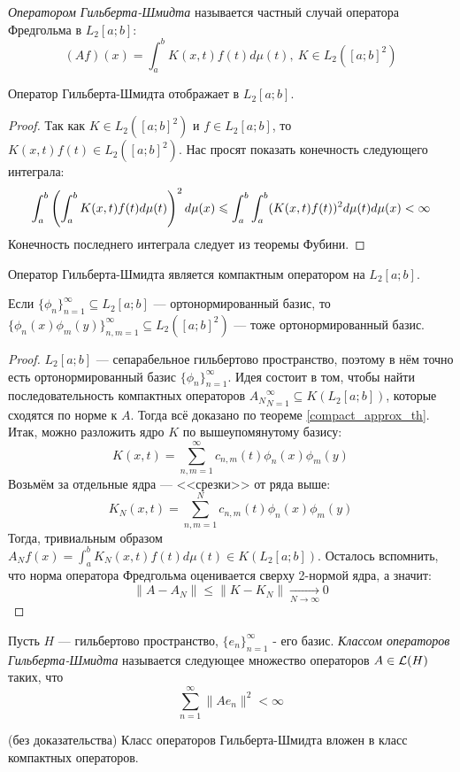 \begin{definition}
	\textit{Оператором Гильберта-Шмидта} называется частный случай оператора Фредгольма в $L_2[a; b]$:
	\[
		(Af)(x) = \int_a^b K(x, t)f(t)d\mu(t),\ K \in L_2([a; b]^2)
	\]
\end{definition}

\begin{proposition}
	Оператор Гильберта-Шмидта отображает в $L_2[a; b]$.
\end{proposition}

\begin{proof}
	Так как $K \in L_2([a; b]^2)$ и $f \in L_2[a; b]$, то $K(x, t)f(t) \in L_2([a; b]^2)$. Нас просят показать конечность следующего интеграла:
	\[
		\int_a^b \left(\int_a^b K(x, t)f(t)d\mu(t)\right)^2d\mu(x) \leqslant \int_a^b \int_a^b (K(x, t)f(t))^2d\mu(t)d\mu(x) < \infty
	\]
	Конечность последнего интеграла следует из теоремы Фубини.
\end{proof}

\begin{theorem}
	Оператор Гильберта-Шмидта является компактным оператором на $L_2[a; b]$.
\end{theorem}

\begin{reminder}
	Если $\{\phi_n\}_{n = 1}^\infty \subseteq L_2[a; b]$ --- ортонормированный базис, то \\ $\{\phi_n(x)\phi_m(y)\}_{n, m = 1}^\infty \subseteq L_2([a; b]^2)$ --- тоже ортонормированный базис.
\end{reminder}

\begin{proof}
	$L_2[a; b]$ --- сепарабельное гильбертово пространство, поэтому в нём точно есть ортонормированный базис $\{\phi_n\}_{n = 1}^\infty$. Идея состоит в том, чтобы найти последовательность компактных операторов ${A_N}_{N = 1}^\infty \subseteq K(L_2[a; b])$, которые сходятся по норме к $A$. Тогда всё доказано по теореме \ref{compact_approx_th}. Итак, можно разложить ядро $K$ по вышеупомянутому базису:
	\[
		K(x, t) = \sum_{n, m = 1}^\infty c_{n, m}(t)\phi_n(x)\phi_m(y)
	\]
	Возьмём за отдельные ядра --- <<срезки>> от ряда выше:
	\[
		K_N(x, t) = \sum_{n, m = 1}^N c_{n, m}(t)\phi_n(x)\phi_m(y)
	\]
	Тогда, тривиальным образом $A_Nf(x) = \int_a^b K_N(x, t)f(t)d\mu(t) \in K(L_2[a; b])$. Осталось вспомнить, что норма оператора Фредгольма оценивается сверху 2-нормой ядра, а значит:
	\[
		\|A - A_N\| \le \|K - K_N\| \xrightarrow[N \to \infty]{} 0
	\]
\end{proof}

\begin{definition}
	Пусть $H$ --- гильбертово пространство, $\{e_n\}_{n = 1}^\infty$ - его базис. \textit{Классом операторов Гильберта-Шмидта} называется следующее множество операторов $A \in \mathcal{L}(H)$ таких, что
	\[
		\sum_{n = 1}^\infty \|Ae_n\|^2 < \infty
	\]
\end{definition}

\begin{proposition} (без доказательства)
	Класс операторов Гильберта-Шмидта вложен в класс компактных операторов.
\end{proposition}